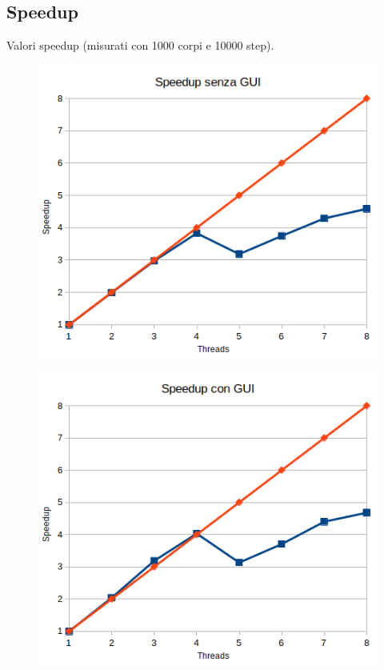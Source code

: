 \documentclass[12pt,a4paper,oneside]{article}
\begin{document}
	\subsection{Speedup}
	Valori speedup (misurati con 1000 corpi e 10000 step).
	
	\begin{figure}[!ht]
		\centering
		\includegraphics[width=0.7\linewidth]{speedup-no-gui}
		\caption{}
		\label{fig:speedup-no-gui}
	\end{figure}
	
	\begin{figure}[!ht]
		\centering
		\includegraphics[width=0.7\linewidth]{speedup-gui}
		\caption{}
		\label{fig:speedup-gui}
	\end{figure}
	
\end{document}
